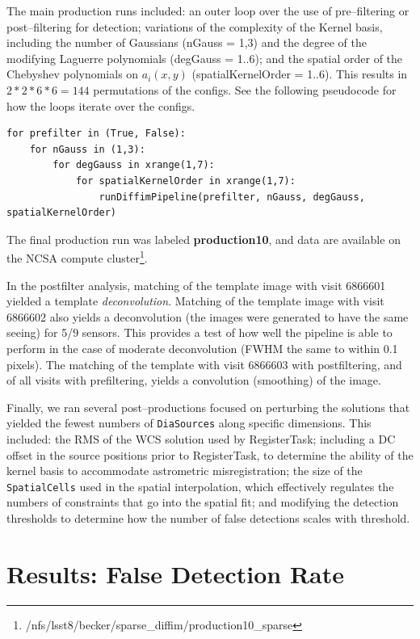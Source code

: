 \documentclass[prd, nofootinbib, floatfix, 11pt,tightenlines,times]{article}
\begin{document}
The main production runs included: an outer loop over the use of
pre--filtering or post--filtering for detection; variations of the
complexity of the Kernel basis, including the number of Gaussians
(nGauss = 1,3) and the degree of the modifying Laguerre polynomials
(degGauss = 1..6); and the spatial order of the Chebyshev polynomials
on $a_i(x,y)$ (spatialKernelOrder = 1..6).  This results in $2*2*6*6=144$ permutations
of the configs.  See the following pseudocode
for how the loops iterate over the configs.

\begin{verbatim}
for prefilter in (True, False):
    for nGauss in (1,3):
        for degGauss in xrange(1,7):
            for spatialKernelOrder in xrange(1,7):
                runDiffimPipeline(prefilter, nGauss, degGauss, spatialKernelOrder)
\end{verbatim}

The final production run
was labeled {\bf production10}, and data are available on the NCSA compute
cluster\footnote{/nfs/lsst8/becker/sparse\_diffim/production10\_sparse}.

In the postfilter analysis, matching of the template image
with visit 6866601 yielded a template {\it deconvolution}.  Matching of the template 
image with visit 6866602 also yields a deconvolution (the images were generated to
have the same seeing) for 5/9 sensors.  This provides a test
of how well the pipeline is able to perform in the case of moderate deconvolution 
(FWHM the same to within 0.1 pixels).  The matching of the template
with visit 6866603 with postfiltering, and of all visits with
prefiltering, yields a convolution (smoothing) of the image. 

Finally, we ran several post--productions focused on perturbing the
solutions that yielded the fewest numbers of {\tt DiaSources} along specific
dimensions.  This included: the RMS of the WCS solution used by
RegisterTask; including a DC offset in the source positions prior to
RegisterTask, to determine the ability of the kernel basis to
accommodate astrometric misregistration; the size of the {\tt
  SpatialCells} used in the spatial interpolation, which effectively
regulates the numbers of constraints that go into the spatial fit; and
modifying the detection thresholds to determine how the number of
false detections scales with threshold.


\section{Results: False Detection Rate}
\end{document}
